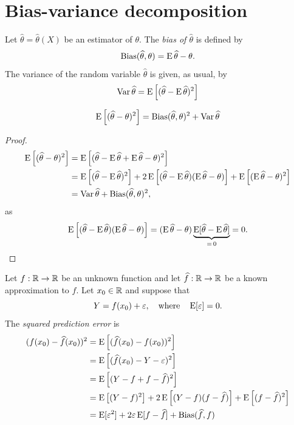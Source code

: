 \documentclass[12pt]{amsart}
\begin{document}
\section{Bias-variance decomposition}
Let $\hat\theta=\hat\theta(X)$ be an estimator of $\theta$. The \emph{bias of $\hat\theta$} is defined by
\[
    \operatorname{Bias}(\widehat\theta,\theta) = \operatorname{E}\widehat\theta - \theta.
\]
The variance of the random variable $\hat\theta$ is given, as usual, by
\[
    \operatorname{Var} \widehat\theta = \operatorname{E}\left[(\widehat\theta - \operatorname{E}\widehat\theta)^2\right]
\]
\begin{theorem}
\[
    \operatorname{E}\left[(\widehat\theta - \theta)^2\right] = \operatorname{Bias}(\widehat\theta,\theta)^2 + \operatorname{Var}\widehat\theta
\]
\end{theorem}
\begin{proof}
    \begin{align*}
        \operatorname{E}\left[(\widehat\theta - \theta)^2\right] &= \operatorname{E}\left[(\widehat\theta - \operatorname{E}\widehat\theta + \operatorname{E}\widehat\theta - \theta)^2\right]\\
        &= \operatorname{E}\left[(\widehat\theta - \operatorname{E}\widehat\theta)^2\right] 
        + 2\operatorname{E}\left[(\widehat\theta - \operatorname{E}\widehat\theta)(\operatorname{E}\widehat\theta - \theta)\right]
        + \operatorname{E}\left[(\operatorname{E}\widehat\theta - \theta)^2\right]\\
        &= \operatorname{Var} \widehat\theta + \operatorname{Bias}(\widehat\theta,\theta)^2,
    \end{align*}
    as
    \[
        \operatorname{E}\left[(\widehat\theta - \operatorname{E}\widehat\theta)(\operatorname{E}\widehat\theta - \theta)\right]
        = (\operatorname{E}\widehat\theta - \theta)\underbrace{\operatorname{E}[\widehat\theta - \operatorname{E}\widehat\theta]}_{=\,0}
        = 0.\qedhere
    \]
\end{proof}
Let $f:\mathbb{R}\to\mathbb{R}$ be an unknown function and let $\widehat f:\mathbb{R}\to\mathbb{R}$ be a known approximation to $f$.
Let $x_0\in\mathbb{R}$ and suppose that
\[
    Y = f(x_0) + \varepsilon,\quad\text{where}\quad \operatorname{E}[\varepsilon]=0.
\]
The \emph{squared prediction error} is
 \begin{align*}
     (f(x_0)-\widehat f(x_0))^2 &=\operatorname{E}\left[(\widehat f(x_0)- f(x_0))^2\right]\\
     &=\operatorname{E}\left[(\widehat f(x_0)- Y - \varepsilon)^2\right]\\
     &= \operatorname{E}\left[(Y - f + f - \widehat f)^2\right]\\
     &= \operatorname{E}\left[(Y - f)^2\right] 
     + 2\operatorname{E}\left[(Y - f)(f - \widehat f)\right]
     + \operatorname{E}\left[(f - \widehat f)^2\right]\\
     &= \operatorname{E}[\varepsilon^2]
     + 2\varepsilon\operatorname{E}[f - \widehat f]
     + \operatorname{Bias}(\widehat f, f)
 \end{align*}
\end{document}
